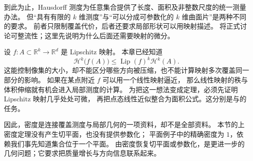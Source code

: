 到此为止，Hausdorff 测度为任意集合提供了长度、面积及非整数尺度的统一测量办法。
但“具有有限的 \(k\) 维测度”与“可以分成可参数化的 \(k\) 维曲面片”是两种不同的要求。
前者只限制覆盖代价，后者还要求局部形状可以用映射描述。
将正式讨论可整流性；这里先说明为什么后面还需要映射的微分。

\ProseParagraphBreak

设 \(f:A\subset\mathbb R^k\rightarrow\mathbb R^d\) 是 Lipschitz 映射。
本章已经知道
\[
 \mathcal H^k\bigl(f(A)\bigr)
 \leq\operatorname{Lip}(f)^k\mathcal H^k(A).
\]
这能控制像集的大小，却不能区分哪些方向被压缩，也不能计算映射多次覆盖同一部分的影响。
如果在某点附近 \(f\) 可以用一个线性映射逼近，
那么线性映射的秩与体积伸缩就有机会进入局部测度的计算。
为把这一想法变成定理，必须先证明 Lipschitz 映射几乎处处可微，
再把点态线性近似整合为面积公式。这分别是与的任务。

\ProseParagraphBreak

因此，密度是连接覆盖测度与局部几何的一项资料，却不是全部资料。
本节的上密度定理没有产生切平面，也没有提供参数化；
平面例子中的精确密度为 \(1\)，依赖我们事先知道集合位于一个平面。
由密度恢复切平面或参数化，是更进一步的几何问题；它要求把质量增长与方向信息联系起来。
